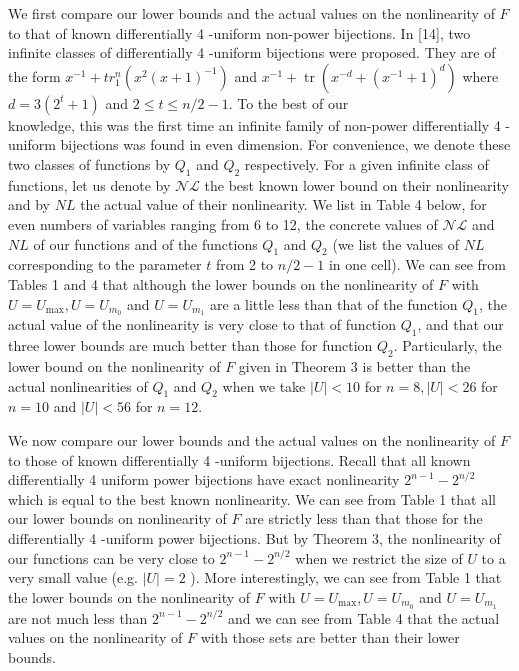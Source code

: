 \documentclass[10pt]{article}
\begin{document}
We first compare our lower bounds and the actual values on the nonlinearity of $F$ to that of known differentially 4 -uniform non-power bijections. In [14], two infinite classes of differentially 4 -uniform bijections were proposed. They are of the form $x^{-1}+t r_{1}^{n}\left(x^{2}(x+1)^{-1}\right)$ and $x^{-1}+\operatorname{tr}\left(x^{-d}+\left(x^{-1}+1\right)^{d}\right)$ where $d=3\left(2^{t}+1\right)$ and $2 \leq t \leq n / 2-1$. To the best of our\\
knowledge, this was the first time an infinite family of non-power differentially 4 -uniform bijections was found in even dimension. For convenience, we denote these two classes of functions by $Q_{1}$ and $Q_{2}$ respectively. For a given infinite class of functions, let us denote by $\mathcal{N} \mathcal{L}$ the best known lower bound on their nonlinearity and by $N L$ the actual value of their nonlinearity. We list in Table 4 below, for even numbers of variables ranging from 6 to 12, the concrete values of $\mathcal{N} \mathcal{L}$ and $N L$ of our functions and of the functions $Q_{1}$ and $Q_{2}$ (we list the values of $N L$ corresponding to the parameter $t$ from 2 to $n / 2-1$ in one cell). We can see from Tables 1 and 4 that although the lower bounds on the nonlinearity of $F$ with $U=U_{\max }, U=U_{m_{0}}$ and $U=U_{m_{1}}$ are a little less than that of the function $Q_{1}$, the actual value of the nonlinearity is very close to that of function $Q_{1}$, and that our three lower bounds are much better than those for function $Q_{2}$. Particularly, the lower bound on the nonlinearity of $F$ given in Theorem 3 is better than the actual nonlinearities of $Q_{1}$ and $Q_{2}$ when we take $|U|<10$ for $n=8,|U|<26$ for $n=10$ and $|U|<56$ for $n=12$.

We now compare our lower bounds and the actual values on the nonlinearity of $F$ to those of known differentially 4 -uniform bijections. Recall that all known differentially 4 uniform power bijections have exact nonlinearity $2^{n-1}-2^{n / 2}$ which is equal to the best known nonlinearity. We can see from Table 1 that all our lower bounds on nonlinearity of $F$ are strictly less than that those for the differentially 4 -uniform power bijections. But by Theorem 3, the nonlinearity of our functions can be very close to $2^{n-1}-2^{n / 2}$ when we restrict the size of $U$ to a very small value (e.g. $|U|=2$ ). More interestingly, we can see from Table 1 that the lower bounds on the nonlinearity of $F$ with $U=U_{\max }, U=U_{m_{0}}$ and $U=U_{m_{1}}$ are not much less than $2^{n-1}-2^{n / 2}$ and we can see from Table 4 that the actual values on the nonlinearity of $F$ with those sets are better than their lower bounds.
\end{document}
